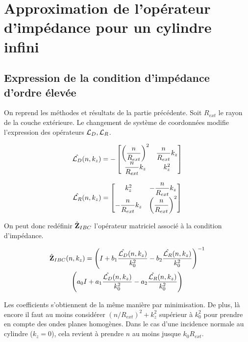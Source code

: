 \section{Approximation de l'opérateur d'impédance pour un cylindre infini}

  \subsection{Expression de la condition d'impédance d'ordre élevée}

    On reprend les méthodes et résultats de la partie précédente.
    Soit \(R_{ext}\) le rayon de la couche extérieure.
    Le changement de système de coordonnées modifie l'expression des opérateurs \({\mathcal{L}_D}, {\mathcal{L}_R}\).

    \begin{equation}
      \hat{{\mathcal{L}_D}}(n,k_z) = -
      \begin{bmatrix}
        \left(\dfrac{n}{R_{ext}}\right)^2 & \dfrac{n}{R_{ext}} k_z
        \\
        \dfrac{n}{R_{ext}} k_z & k_z^2
      \end{bmatrix}
    \end{equation}

    \begin{equation}
      \hat{{\mathcal{L}_R}}(n,k_z) =
      \begin{bmatrix}
        k_z^2 & -\dfrac{n}{R_{ext}} k_z
        \\
        -\dfrac{n}{R_{ext}} k_z & \left(\dfrac{n}{R_{ext}}\right)^2
      \end{bmatrix}
    \end{equation}

    On peut donc redéfinir \(\hat{\mathbf{Z}}_{IBC}\) l’opérateur matriciel associé à la condition d'impédance.

    \begin{multline}
        \hat{\mathbf{Z}}_{IBC}(n,k_z) = \left(I + b_1 \dfrac{\hat{{\mathcal{L}_D}}(n,k_z)}{k_0^2} - b_2 \dfrac{\hat{{\mathcal{L}_R}}(n,k_z)}{k_0^2} \right)^{-1}\\
        \left(a_0 I + a_1 \dfrac{\hat{{\mathcal{L}_D}}(n,k_z)}{k_0^2} - a_2 \dfrac{\hat{{\mathcal{L}_R}}(n,k_z)}{k_0^2}\right)
    \end{multline}

    Les coefficients s'obtiennent de la même manière par minimisation.
    De plus, là encore il faut au moins considérer \((n\slash R_{ext})^2 + k_z^2\) supérieur à \(k_0^2\) pour prendre en compte des ondes planes homogènes. Dans le cas d'une incidence normale au cylindre (\(k_z = 0 \)), cela revient à prendre \(n\) au moins jusque \(k_0 R_{ext}\).

